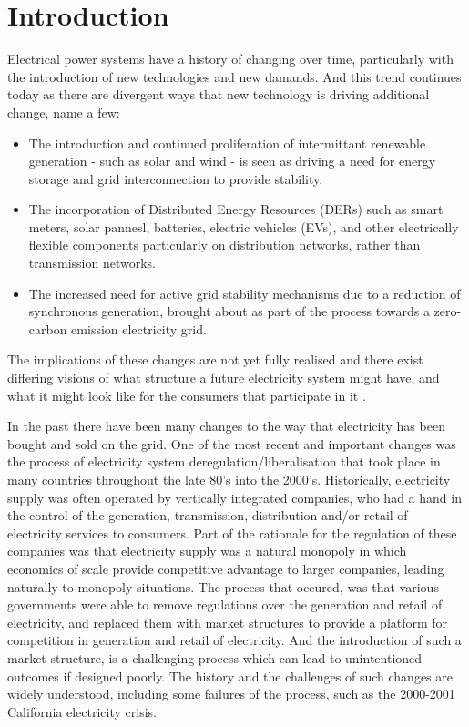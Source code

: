 \chapter{Introduction}
\label{cha:intro}



Electrical power systems have a history of changing over time, particularly with the introduction of new technologies and new damands.
And this trend continues today as there are divergent ways that new technology is driving additional change, \cite{BELL2018765} name a few:
\begin{itemize}
\item The introduction and continued proliferation of intermittant renewable generation - such as solar and wind - is seen as driving a need for energy storage and grid interconnection to provide stability.
\item The incorporation of Distributed Energy Resources (DERs) such as smart meters, solar pannesl, batteries, electric vehicles (EVs), and other electrically flexible components particularly on distribution networks, rather than transmission networks.
\item The increased need for active grid stability mechanisms due to a reduction of synchronous generation, brought about as part of the process towards a zero-carbon emission electricity grid.
\end{itemize}

The implications of these changes are not yet fully realised and there exist differing visions of what structure a future electricity system might have, and what it might look like for the consumers that participate in it \cite{Parag2016}.

In the past there have been many changes to the way that electricity has been bought and sold on the grid.
One of the most recent and important changes was the process of electricity system deregulation/liberalisation that took place in many countries throughout the late 80's into the 2000's.
Historically, electricity supply was often operated by vertically integrated companies, who had a hand in the control of the generation, transmission, distribution and/or retail of electricity services to consumers.
Part of the rationale for the regulation of these companies was that electricity supply was a natural monopoly in which economics of scale provide competitive advantage to larger companies, leading naturally to monopoly situations.
The process that occured, was that various governments were able to remove regulations over the generation and retail of electricity, and replaced them with market structures to provide a platform for competition in generation and retail of electricity.
And the introduction of such a market structure, is a challenging process which can lead to unintentioned outcomes if designed poorly.
The history and the challenges of such changes are widely understood, including some failures of the process, such as the 2000-2001 California electricity crisis. \cite{griffin2009electricity}

